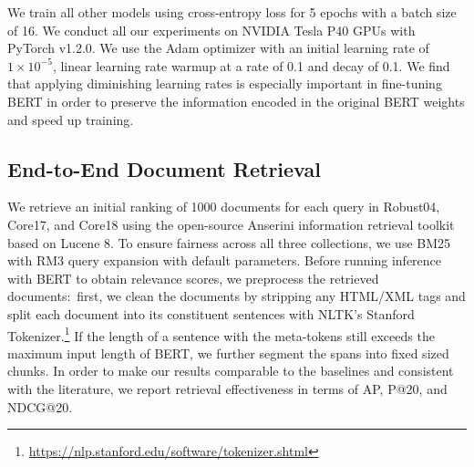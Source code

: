 We train all other models using cross-entropy loss for 5 epochs with a batch size of 16.
We conduct all our experiments on NVIDIA Tesla P40 GPUs with PyTorch v1.2.0.
We use the Adam optimizer \cite{kingma2014adam} with an initial learning rate of $ 1 \times 10^{-5}$, linear learning rate warmup at a rate of 0.1 and decay of 0.1.
We find that applying diminishing learning rates is especially important in fine-tuning BERT in order to preserve the information encoded in the original BERT weights and speed up training.

\subsection{End-to-End Document Retrieval}

We retrieve an initial ranking of 1000 documents for each query in Robust04, Core17, and Core18 using the open-source Anserini information retrieval toolkit based on Lucene 8.
To ensure fairness across all three collections, we use BM25 with RM3 query expansion with default parameters.
Before running inference with BERT to obtain relevance scores, we preprocess the retrieved documents:\
first, we clean the documents by stripping any HTML/XML tags and split each document into its constituent sentences with NLTK's Stanford Tokenizer.\footnote{\url{https://nlp.stanford.edu/software/tokenizer.shtml}}
If the length of a sentence with the meta-tokens still exceeds the maximum input length of BERT, we further segment the spans into fixed sized chunks.
In order to make our results comparable to the baselines and consistent with the literature, we report retrieval effectiveness in terms of AP, P@20, and NDCG@20.

